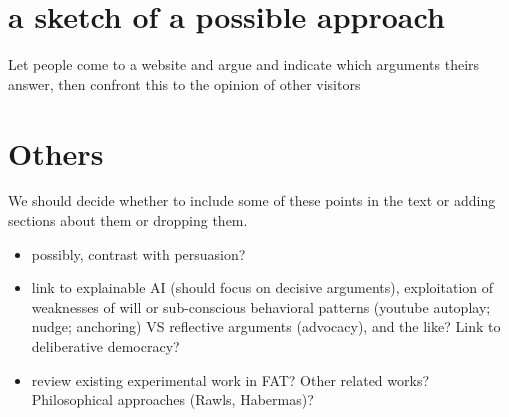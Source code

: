 \documentclass[version=3.21, pagesize, twoside=off, bibliography=totoc, DIV=calc, fontsize=12pt, a4paper]{scrartcl}
\begin{document}
\section{a sketch of a possible approach}
Let people come to a website and argue and indicate which arguments theirs answer, then confront this to the opinion of other visitors

\section{Others}
We should decide whether to include some of these points in the text or adding sections about them or dropping them.
\begin{itemize}
	\item possibly, contrast with persuasion?
	\item link to explainable AI (should focus on decisive arguments), exploitation of weaknesses of will or sub-conscious behavioral patterns (youtube autoplay; nudge; anchoring) VS reflective arguments (advocacy), and the like? Link to deliberative democracy?
	\item review existing experimental work in FAT? Other related works? Philosophical approaches (Rawls, Habermas)?
\end{itemize}

%
\end{document}
